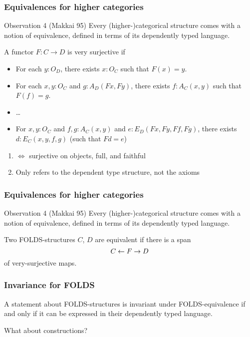 \documentclass{beamer}
\begin{document}
\begin{frame}
  \frametitle{Equivalences for higher categories}
  \begin{block}{Observation 4 (Makkai 95)}
    Every (higher-)categorical structure comes with a notion of \alert<1>{equivalence}, defined in terms of its dependently typed language.
  \end{block}
    A functor $F:C\to D$ is \alert<1>{very surjective} if
    \begin{itemize}
    \item For each $y:O_D$, there exists $x:O_C$ such that $F(x)=y$.
    \item For each $x,y:O_C$ and $g:A_D(Fx,Fy)$, there exists $f:A_C(x,y)$ such that $F(f)=g$.
    \item \dots
    \item For $x,y:O_C$ and $f,g:A_C(x,y)$ and $e:E_D(Fx,Fy,Ff,Fg)$, there exists $d:E_C(x,y,f,g)$ (such that $Fd=e$)
    \end{itemize}
  \pause\medskip
  \begin{enumerate}
  \item $\iff$ surjective on objects, full, and faithful
  \item \alert{Only} refers to the dependent type structure, not the axioms
  \end{enumerate}
\end{frame}

\begin{frame}
  \frametitle{Equivalences for higher categories}
  \begin{block}{Observation 4 (Makkai 95)}
    Every (higher-)categorical structure comes with a notion of {equivalence}, defined in terms of its dependently typed language.
  \end{block}
  \begin{definition}
    Two FOLDS-structures $C$, $D$ are \alert<1>{equivalent} if there is a span
    \[ C \leftarrow F \to D\]
    of very-surjective maps.
  \end{definition}
\end{frame}

\begin{frame}
  \frametitle{Invariance for FOLDS}
  \begin{theorem}[Makkai]
    A \alert<2>{statement} about FOLDS-structures is invariant under FOLDS-equivalence \alert<1>{if and only if} it can be expressed in their dependently typed language.
  \end{theorem}
  \pause\bigskip
  What about \alert{constructions}?
\end{frame}
\end{document}
